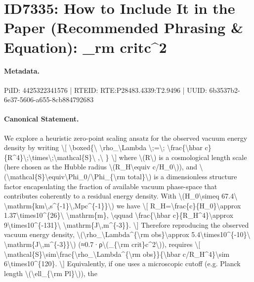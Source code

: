 \section*{ID7335: How to Include It in the Paper (Recommended Phrasing \& Equation): \_rm critc\textasciicircum{}2}
\paragraph{Metadata.}
PiID: 4425322341576 | RTEID: RTE:P28483.4339:T2.9496 | UUID: 6b3537b2-6e37-5606-a655-8cb884792683

\paragraph{Canonical Statement.}
We explore a heuristic zero-point scaling ansatz for the observed vacuum energy density by writing \textbackslash{}[ \textbackslash{}boxed\{\textbackslash{} \textbackslash{}rho\_\textbackslash{}Lambda \textbackslash{};=\textbackslash{}; \textbackslash{}frac\{\textbackslash{}hbar c\}\{R\textasciicircum{}4\}\textbackslash{};\textbackslash{}times\textbackslash{};\textbackslash{}mathcal\{S\}\textbackslash{} ,\textbackslash{} \} \textbackslash{}] where \textbackslash{}(R\textbackslash{}) is a cosmological length scale (here chosen as the Hubble radius \textbackslash{}(R\_H\textbackslash{}equiv c/H\_0\textbackslash{})), and \textbackslash{}(\textbackslash{}mathcal\{S\}\textbackslash{}equiv\textbackslash{}Phi\_0/\textbackslash{}Phi\_\{\textbackslash{}rm total\}\textbackslash{}) is a dimensionless structure factor encapsulating the fraction of available vacuum phase-space that contributes coherently to a residual energy density. With \textbackslash{}(H\_0\textbackslash{}simeq 67.4\textbackslash{} \textbackslash{}mathrm\{km\textbackslash{},s\textasciicircum{}\{-1\}\textbackslash{},Mpc\textasciicircum{}\{-1\}\}\textbackslash{}) we have \textbackslash{}[ R\_H=\textbackslash{}frac\{c\}\{H\_0\}\textbackslash{}approx 1.37\textbackslash{}times10\textasciicircum{}\{26\}\textbackslash{} \textbackslash{}mathrm\{m\}, \textbackslash{}qquad \textbackslash{}frac\{\textbackslash{}hbar c\}\{R\_H\textasciicircum{}4\}\textbackslash{}approx 9\textbackslash{}times10\textasciicircum{}\{-131\}\textbackslash{} \textbackslash{}mathrm\{J\textbackslash{},m\textasciicircum{}\{-3\}\}. \textbackslash{}] Therefore reproducing the observed vacuum energy density, \textbackslash{}(\textbackslash{}rho\_\textbackslash{}Lambda\textasciicircum{}\{\textbackslash{}rm obs\}\textbackslash{}approx 5.4\textbackslash{}times10\textasciicircum{}\{-10\}\textbackslash{} \textbackslash{}mathrm\{J\textbackslash{},m\textasciicircum{}\{-3\}\}\textbackslash{}) (≈0.7·ρ\textbackslash{}(\_\{\textbackslash{}rm crit\}c\textasciicircum{}2\textbackslash{})), requires \textbackslash{}[ \textbackslash{}mathcal\{S\}\textbackslash{}sim\textbackslash{}frac\{\textbackslash{}rho\_\textbackslash{}Lambda\textasciicircum{}\{\textbackslash{}rm obs\}\}\{\textbackslash{}hbar c/R\_H\textasciicircum{}4\}\textbackslash{}sim 6\textbackslash{}times10\textasciicircum{}\{120\}. \textbackslash{}] Equivalently, if one uses a microscopic cutoff (e.g. Planck length \textbackslash{}(\textbackslash{}ell\_\{\textbackslash{}rm Pl\}\textbackslash{})), the 
